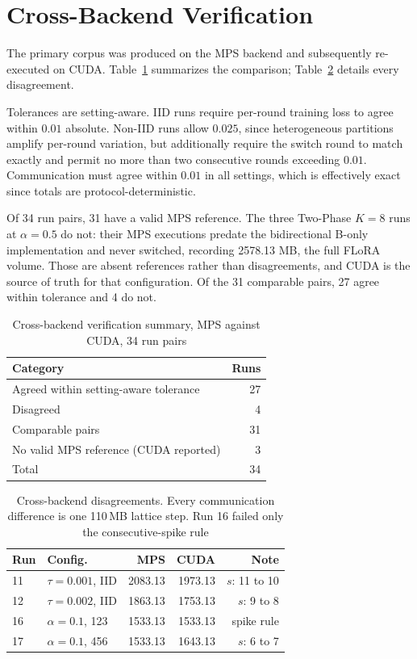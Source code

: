 \section{Cross-Backend Verification}
\label{app:crossbackend}

The primary corpus was produced on the MPS backend and subsequently re-executed on CUDA. Table~\ref{tab:d1} summarizes the comparison; Table~\ref{tab:d2} details every disagreement.

Tolerances are setting-aware. IID runs require per-round training loss to agree within $0.01$ absolute. Non-IID runs allow $0.025$, since heterogeneous partitions amplify per-round variation, but additionally require the switch round to match exactly and permit no more than two consecutive rounds exceeding $0.01$. Communication must agree within $0.01$ in all settings, which is effectively exact since totals are protocol-deterministic.

Of 34 run pairs, 31 have a valid MPS reference. The three Two-Phase $K{=}8$ runs at $\alpha{=}0.5$ do not: their MPS executions predate the bidirectional B-only implementation and never switched, recording 2578.13 MB, the full FLoRA volume. Those are absent references rather than disagreements, and CUDA is the source of truth for that configuration. Of the 31 comparable pairs, 27 agree within tolerance and 4 do not.

\begin{table}[tbp]
\centering
\footnotesize
\renewcommand{\arraystretch}{0.88}
\setlength{\tabcolsep}{6pt}
\caption{Cross-backend verification summary, MPS against CUDA, 34 run pairs}
\label{tab:d1}
\begin{tabular}{@{}lr@{}}
\toprule
Category & Runs \\
\midrule
Agreed within setting-aware tolerance & 27 \\
Disagreed & 4 \\
\midrule
Comparable pairs & 31 \\
No valid MPS reference (CUDA reported) & 3 \\
\midrule
Total & 34 \\
\bottomrule
\end{tabular}
\end{table}

\begin{table}[tbp]
\centering
\footnotesize
\scriptsize
\renewcommand{\arraystretch}{0.85}
\setlength{\tabcolsep}{3pt}
\caption{Cross-backend disagreements. Every communication difference is one 110\,MB lattice step. Run 16 failed only the consecutive-spike rule}
\label{tab:d2}
\begin{tabular}{@{}llrrr@{}}
\toprule
Run & Config. & MPS & CUDA & Note \\
\midrule
11 & $\tau{=}0.001$, IID & 2083.13 & 1973.13 & $s$: 11 to 10 \\
12 & $\tau{=}0.002$, IID & 1863.13 & 1753.13 & $s$: 9 to 8 \\
16 & $\alpha{=}0.1$, 123 & 1533.13 & 1533.13 & spike rule \\
17 & $\alpha{=}0.1$, 456 & 1533.13 & 1643.13 & $s$: 6 to 7 \\
\bottomrule
\end{tabular}
\end{table}

